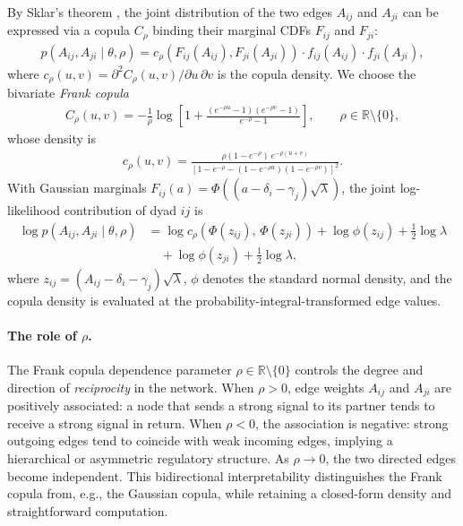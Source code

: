 By Sklar's theorem \citep{sklar1959}, the joint distribution of the two
edges $A_{ij}$ and $A_{ji}$ can be expressed via a copula $C_\rho$
binding their marginal CDFs $F_{ij}$ and $F_{ji}$:
%
\begin{align}
p(A_{ij}, A_{ji} \mid \theta, \rho)
  = c_\rho\!\left(F_{ij}(A_{ij}), F_{ji}(A_{ji})\right)
    \cdot f_{ij}(A_{ij}) \cdot f_{ji}(A_{ji}),
\end{align}
%
where $c_\rho(u,v) = \partial^2 C_\rho(u,v) / \partial u\, \partial v$
is the copula density.  We choose the bivariate \emph{Frank copula}
%
\begin{align}
\label{eq:frank_cdf}
C_\rho(u,v)
  = -\frac{1}{\rho}
    \log\!\left[1 + \frac{(e^{-\rho u}-1)(e^{-\rho v}-1)}{e^{-\rho}-1}\right],
\qquad \rho \in \mathbb{R} \setminus \{0\},
\end{align}
%
whose density is
%
\begin{align}
\label{eq:frank_density}
c_\rho(u,v)
  = \frac{\rho(1 - e^{-\rho})\, e^{-\rho(u+v)}}
         {\left[1 - e^{-\rho} - (1-e^{-\rho u})(1-e^{-\rho v})\right]^2}.
\end{align}
%
With Gaussian marginals $F_{ij}(a) = \Phi\!\left((a - \delta_i - \gamma_j)
\sqrt{\lambda}\right)$, the joint log-likelihood contribution of dyad $ij$
is
%
\begin{align}
\label{eq:dyad_loglik}
\log p(A_{ij}, A_{ji} \mid \theta, \rho)
  &= \log c_\rho\!\left(\Phi(z_{ij}),\, \Phi(z_{ji})\right)
  + \log \phi(z_{ij}) + \tfrac{1}{2}\log\lambda  \nonumber\\
  &\quad + \log\phi(z_{ji}) + \tfrac{1}{2}\log\lambda,
\end{align}
%
where $z_{ij} = (A_{ij} - \delta_i - \gamma_j)\sqrt{\lambda}$,
$\phi$ denotes the standard normal density, and the copula density is
evaluated at the probability-integral-transformed edge values.

\paragraph{The role of $\rho$.}
The Frank copula dependence parameter $\rho \in \mathbb{R}\setminus\{0\}$
controls the degree and direction of \emph{reciprocity} in the network.
When $\rho > 0$, edge weights $A_{ij}$ and $A_{ji}$ are positively
associated: a node that sends a strong signal to its partner tends to
receive a strong signal in return.  When $\rho < 0$, the association is
negative: strong outgoing edges tend to coincide with weak incoming edges,
implying a hierarchical or asymmetric regulatory structure.  As
$\rho \to 0$, the two directed edges become independent.  This bidirectional
interpretability distinguishes the Frank copula from, e.g., the
Gaussian copula, while retaining a closed-form density and straightforward
computation.


